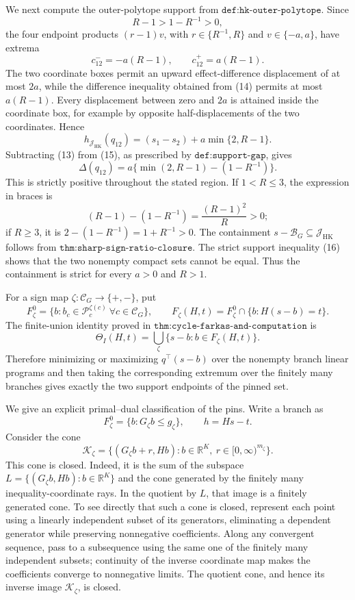 We next compute the outer-polytope support from \(\texttt{def:hk-outer-polytope}\).  Since
\[
 R-1>1-R^{-1}>0,
\]
the four endpoint products \((r-1)v\), with \(r\in\{R^{-1},R\}\) and \(v\in\{-a,a\}\), have extrema
\[
 c_{12}^-=-a(R-1),
 \qquad
 c_{12}^+=a(R-1).
\tag{14}
\]
The two coordinate boxes permit an upward effect-difference displacement of at most \(2a\), while the difference inequality obtained from (14) permits at most \(a(R-1)\).  Every displacement between zero and \(2a\) is attained inside the coordinate box, for example by opposite half-displacements of the two coordinates.  Hence
\[
 h_{\mathcal J_{\mathrm{HK}}}(q_{12})
 =(s_1-s_2)+a\min\{2,R-1\}.
\tag{15}
\]
Subtracting (13) from (15), as prescribed by \(\texttt{def:support-gap}\), gives
\[
 \Delta(q_{12})
 =a\{\min(2,R-1)-(1-R^{-1})\}.
\tag{16}
\]
This is strictly positive throughout the stated region.  If \(1<R\le3\), the expression in braces is
\[
 (R-1)-(1-R^{-1})=\frac{(R-1)^2}{R}>0;
\]
if \(R\ge3\), it is \(2-(1-R^{-1})=1+R^{-1}>0\).  The containment \(s-\mathcal B_G\subseteq\mathcal J_{\mathrm{HK}}\) follows from \(\texttt{thm:sharp-sign-ratio-closure}\).  The strict support inequality (16) shows that the two nonempty compact sets cannot be equal.  Thus the containment is strict for every \(a>0\) and \(R>1\).

For a sign map \(\zeta:\mathcal C_G\to\{+,-\}\), put
\[
 F_{\zeta}^0=\{b:b_c\in\mathcal P_c^{\zeta(c)}\ \forall c\in\mathcal C_G\},
 \qquad
 F_{\zeta}(H,t)=F_{\zeta}^0\cap\{b:H(s-b)=t\}.
\]
The finite-union identity proved in \(\texttt{thm:cycle-farkas-and-computation}\) is
\[
 \Theta_I(H,t)=
 \bigcup_{\zeta}\{s-b:b\in F_{\zeta}(H,t)\}.
\tag{17}
\]
Therefore minimizing or maximizing \(q^{\top}(s-b)\) over the nonempty branch linear programs and then taking the corresponding extremum over the finitely many branches gives exactly the two support endpoints of the pinned set.

We give an explicit primal--dual classification of the pins.  Write a branch as
\[
 F_{\zeta}^0=\{b:G_{\zeta}b\le g_{\zeta}\},
 \qquad h=Hs-t.
\]
Consider the cone
\[
 \mathcal K_{\zeta}
 =\{(G_{\zeta}b+r,Hb):b\in\mathbb R^K,\ r\in[0,\infty)^{m_{\zeta}}\}.
\tag{18}
\]
This cone is closed.  Indeed, it is the sum of the subspace
\(L=\{(G_{\zeta}b,Hb):b\in\mathbb R^K\}\) and the cone generated by the finitely many inequality-coordinate rays.  In the quotient by \(L\), that image is a finitely generated cone.  To see directly that such a cone is closed, represent each point using a linearly independent subset of its generators, eliminating a dependent generator while preserving nonnegative coefficients.  Along any convergent sequence, pass to a subsequence using the same one of the finitely many independent subsets; continuity of the inverse coordinate map makes the coefficients converge to nonnegative limits.  The quotient cone, and hence its inverse image \(\mathcal K_{\zeta}\), is closed.

